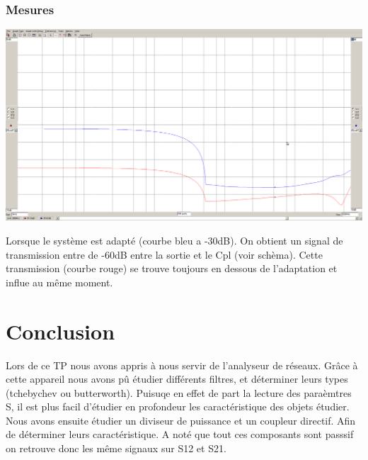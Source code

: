 \documentclass[a4paper,12pt]{report}            %
\begin{document}
\subsection{Mesures}
\begin{center}\includegraphics[scale = 0.25]{pic/cdop.png} \\\end{center}
Lorsque le système est adapté (courbe bleu a -30dB). On obtient un signal de transmission entre 
de -60dB entre la sortie et le Cpl (voir schèma). Cette transmission (courbe rouge) se trouve 
toujours en dessous de l'adaptation et influe au même moment. 
\chapter{Conclusion}
Lors de ce TP nous avons appris à nous servir de l'analyseur de réseaux. Grâce à cette appareil
nous avons pû étudier différents filtres, et déterminer leurs types (tchebychev ou butterworth). 
Puisuqe en effet de part la lecture des paraèmtres S, il est plus facil d'étudier en profondeur les 
caractéristique des objets étudier.
Nous avons ensuite étudier un diviseur de puissance et un coupleur directif. Afin de déterminer leurs
caractéristique.
A noté que tout ces composants sont passsif on retrouve donc les même signaux sur S12 et S21.
\end{document}
